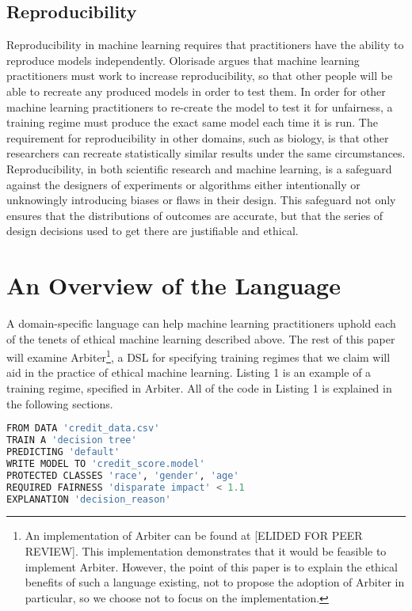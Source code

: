 \documentclass[sigconf]{acmart}
\begin{document}
\subsection{Reproducibility}
Reproducibility in machine learning requires that practitioners have the ability to reproduce models independently. Olorisade  argues that machine learning practitioners must work to increase reproducibility, so that other people will be able to recreate any produced models in order to test them. In order for other machine learning practitioners to re-create the model to test it for unfairness, a training regime must produce the exact same model each time it is run. The requirement for reproducibility in other domains, such as biology, is that other researchers can recreate statistically similar results under the same circumstances. Reproducibility, in both scientific research and machine learning, is a safeguard against the designers of experiments or algorithms either intentionally or unknowingly introducing biases or flaws in their design. This safeguard not only ensures that the distributions of outcomes are accurate, but that the series of design decisions used to get there are justifiable and ethical.

\section{An Overview of the Language}
A domain-specific language can help machine learning practitioners uphold each of the tenets of ethical machine learning described above. The rest of this paper will examine Arbiter\footnote{An implementation of Arbiter can be found at [ELIDED FOR PEER REVIEW]. This implementation demonstrates that it would be feasible to implement Arbiter. However, the point of this paper is to explain the ethical benefits of such a language existing, not to propose the adoption of Arbiter in particular, so we choose not to focus on the implementation.}, a DSL for specifying training regimes that we claim will aid in the practice of ethical machine learning. Listing 1 is an example of a training regime, specified in Arbiter. All of the code in Listing 1 is explained in the following sections.

\begin{lstlisting}[language=Python,caption=Arbiter example.]
FROM DATA 'credit_data.csv'
TRAIN A 'decision tree'
PREDICTING 'default'
WRITE MODEL TO 'credit_score.model'
PROTECTED CLASSES 'race', 'gender', 'age'
REQUIRED FAIRNESS 'disparate impact' < 1.1
EXPLANATION 'decision_reason'
\end{lstlisting}
\end{document}
